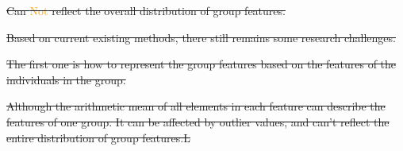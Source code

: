 \documentclass[
 size=14pt,
 paper=smartboard,  %
 mode=present, 		%
 display=slides, 	%
 style=tuliplab,  	%
 pauseslide,
 fleqn,leqno]{powerdot}
\providecommand{\DIFdeltex}[1]{{\protect\color{red}\sout{#1}}}                      %
\providecommand{\DIFdelbegin}{} %
\providecommand{\DIFdelend}{} %
\providecommand{\DIFdel}[1]{\texorpdfstring{\DIFdeltex{#1}}{}} %
\newcommand{\DIFscaledelfig}{0.5}
\newlength{\DIFdelgraphicswidth} %
\newlength{\DIFdelgraphicsheight} %
\newcommand{\DIFdelincludegraphics}[2][]{%
\sbox{\DIFdelgraphicsbox}{\DIFOincludegraphics[#1]{#2}}%
\settoboxwidth{\DIFdelgraphicswidth}{\DIFdelgraphicsbox} %
\settoboxtotalheight{\DIFdelgraphicsheight}{\DIFdelgraphicsbox} %
\scalebox{\DIFscaledelfig}{%
\parbox[b]{\DIFdelgraphicswidth}{\usebox{\DIFdelgraphicsbox}\\[-\baselineskip] \rule{\DIFdelgraphicswidth}{0em}}\llap{\resizebox{\DIFdelgraphicswidth}{\DIFdelgraphicsheight}{%
\setlength{\unitlength}{\DIFdelgraphicswidth}%
\begin{picture}(1,1)%
\thicklines\linethickness{2pt} %
{\color[rgb]{1,0,0}\put(0,0){\framebox(1,1){}}}%
{\color[rgb]{1,0,0}\put(0,0){\line( 1,1){1}}}%
{\color[rgb]{1,0,0}\put(0,1){\line(1,-1){1}}}%
\end{picture}%
}\hspace*{3pt}}} %
} %
\DeclareRobustCommand{\DIFdelbegin}{\DIFOdelbegin \let\includegraphics\DIFdelincludegraphics} %
\DeclareRobustCommand{\DIFdelend}{\DIFOaddend \let\includegraphics\DIFOincludegraphics} %
\begin{document}
\DIFdelbegin %
\DIFdel{Can \textcolor{orange}{Not} reflect the overall distribution of group features.
}%
\DIFdelend %

\DIFdelbegin %
\DIFdel{Based on current existing methods,
there still remains some research challenges.
}\DIFdelend %

\DIFdelbegin \DIFdel{The first one is how to represent the group features
based on the features of the individuals in the group.
}\DIFdelend %

\DIFdelbegin \DIFdel{Although the arithmetic mean of all elements
in each feature can describe the features of one group.
It can be affected by outlier values,
and can't reflect the entire distribution of group features.L
}%
\DIFdelend %

\DIFdelbegin %
\DIFdelend %
\end{document}
